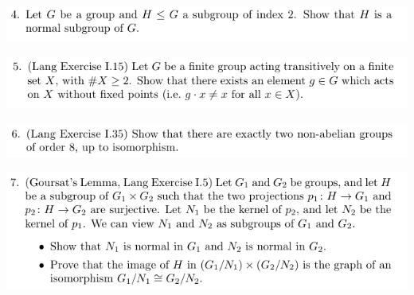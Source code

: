 \documentclass[12pt,letterpaper,boxed]{hmcpset}
\begin{document}
\newpage


\begin{problem}
	\includegraphics[scale=0.8]{4.png}
	\hfill
\end{problem}

\begin{solution}
\end{solution}

\newpage



\begin{problem}
	\includegraphics[scale=0.8]{5.png}
	\hfill
\end{problem}

\begin{solution}
\end{solution}

\newpage


\begin{problem}
	\includegraphics[scale=0.8]{6.png}
	\hfill
\end{problem}

\begin{solution}
\end{solution}

\newpage


\begin{problem}
	\includegraphics[scale=0.8]{7.png}
	\hfill
\end{problem}

\begin{solution}
\end{solution}

\newpage
\end{document}

